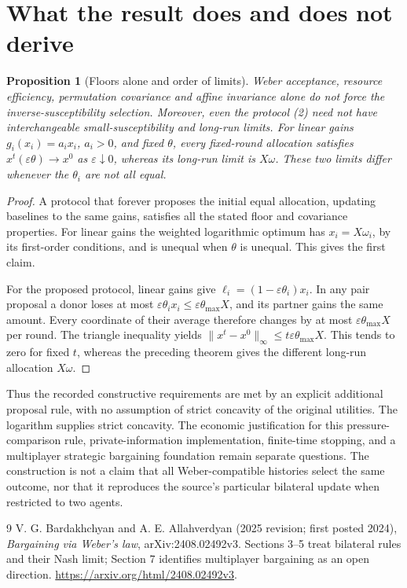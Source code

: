 \documentclass[11pt]{article}
\newtheorem{proposition}[theorem]{Proposition}
\theoremstyle{remark}\newtheorem{remark}[theorem]{Remark}
\begin{document}
\section*{What the result does and does not derive}
\begin{proposition}[Floors alone and order of limits]
Weber acceptance, resource efficiency, permutation covariance and affine invariance alone do not force the inverse-susceptibility selection. Moreover, even the protocol (2) need not have interchangeable small-susceptibility and long-run limits. For linear gains $g_i(x_i)=a_i x_i$, $a_i>0$, and fixed $\theta$, every fixed-round allocation satisfies $x^t(\varepsilon\theta)\to x^0$ as $\varepsilon\downarrow0$, whereas its long-run limit is $X\omega$. These two limits differ whenever the $\theta_i$ are not all equal.
\end{proposition}
\begin{proof}
A protocol that forever proposes the initial equal allocation, updating baselines to the same gains, satisfies all the stated floor and covariance properties. For linear gains the weighted logarithmic optimum has $x_i=X\omega_i$, by its first-order conditions, and is unequal when $\theta$ is unequal. This gives the first claim.

For the proposed protocol, linear gains give $\ell_i=(1-\varepsilon\theta_i)x_i$. In any pair proposal a donor loses at most $\varepsilon\theta_i x_i\le\varepsilon\theta_{\max}X$, and its partner gains the same amount. Every coordinate of their average therefore changes by at most $\varepsilon\theta_{\max}X$ per round. The triangle inequality yields $\|x^t-x^0\|_\infty\le t\varepsilon\theta_{\max}X$. This tends to zero for fixed $t$, whereas the preceding theorem gives the different long-run allocation $X\omega$.
\end{proof}

Thus the recorded constructive requirements are met by an explicit additional proposal rule, with no assumption of strict concavity of the original utilities. The logarithm supplies strict concavity. The economic justification for this pressure-comparison rule, private-information implementation, finite-time stopping, and a multiplayer strategic bargaining foundation remain separate questions. The construction is not a claim that all Weber-compatible histories select the same outcome, nor that it reproduces the source's particular bilateral update when restricted to two agents.

\begin{thebibliography}{9}
 V. G. Bardakhchyan and A. E. Allahverdyan (2025 revision; first posted 2024), \emph{Bargaining via Weber's law}, arXiv:2408.02492v3. Sections 3--5 treat bilateral rules and their Nash limit; Section 7 identifies multiplayer bargaining as an open direction. \url{https://arxiv.org/html/2408.02492v3}.
\end{thebibliography}
\end{document}
